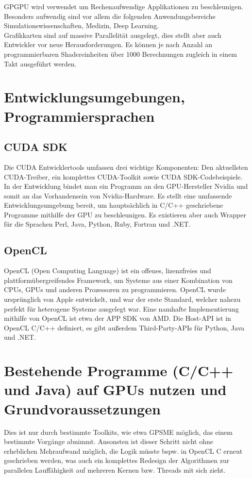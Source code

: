 \documentclass[letterpaper, 12pt]{article}
\let\tempsection\section
\renewcommand\section[1]{\vspace{-0.3cm}\tempsection{#1}\vspace{-0.3cm}}
\let\tempsubsection\subsection
\renewcommand\subsection[1]{\vspace{0cm}\tempsubsection{#1}\vspace{0cm}}
\begin{document}
GPGPU wird verwendet um Rechenaufwendige Applikationen zu beschleunigen. Besonders aufwendig sind vor allem die folgenden Anwendungsbereiche Simulationswissenschaften, Medizin, Deep Learning. \\

Grafikkarten sind auf massive Parallelität ausgelegt, dies stellt aber auch Entwickler vor neue Herausforderungen. Es können je nach Anzahl an programmierbaren Shadereinheiten über 1000 Berechnungen zugleich in einem Takt ausgeführt werden. \cite{elko} \cite{Ausarbeitung}

\section{Entwicklungsumgebungen, Programmiersprachen}
\subsection{CUDA SDK}
Die CUDA Entwicklertools umfassen drei wichtige Komponenten: Den aktuellsten CUDA-Treiber, ein komplettes CUDA-Toolkit sowie CUDA SDK-Codebeispiele. In der Entwicklung bindet man ein Programm an den GPU-Hersteller Nvidia und somit an das Vorhandensein von Nvidia-Hardware. Es stellt eine umfassende Entwicklungsumgebung bereit, um hauptsächlich in C/C++ geschriebene Programme mithilfe der GPU zu beschleunigen. Es existieren aber auch Wrapper für die Sprachen Perl, Java, Python, Ruby, Fortran und .NET. \cite{cuda}

\subsection{OpenCL}
OpenCL (Open Computing Language) ist ein offenes, lizenzfreies und plattformübergreifendes Framework, um Systeme aus einer Kombination von CPUs, GPUs und anderen Prozessoren zu programmieren. OpenCL wurde ursprünglich von Apple entwickelt, und war der erste Standard, welcher nahezu perfekt für heterogene Systeme ausgelegt war. Eine namhafte Implementierung mithilfe von OpenCL ist etwa der APP SDK von AMD. Die Host-API ist in OpenCL C/C++ definiert, es gibt außerdem Third-Party-APIs für Python, Java und .NET. \cite{Ausarbeitung}

\section{Bestehende Programme (C/C++ und Java) auf GPUs nutzen und Grundvoraussetzungen}
Dies ist nur durch bestimmte Toolkits, wie etwa GPSME \cite{gpsme} möglich, das einem bestimmte Vorgänge abnimmt. Ansonsten ist dieser Schritt nicht ohne erheblichen Mehraufwand möglich, die Logik müsste bspw. in OpenCL C erneut geschrieben werden, was auch ein komplettes Redesign der Algorithmen zur parallelen Lauffähigkeit auf mehreren Kernen bzw. Threads mit sich zieht.
\end{document}
